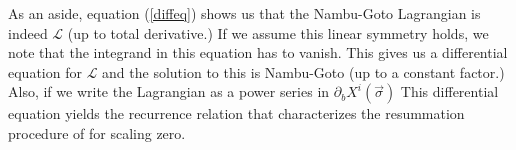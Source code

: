 \documentclass[%
 reprint,
 amsmath,amssymb,
 aps,
]{revtex4-1}
\begin{document}
As an aside, equation (\ref{diffeq}) shows us that the Nambu-Goto Lagrangian is indeed $\mathcal{L}$ (up to total derivative.) If we assume
this linear symmetry holds, we note that the integrand in this equation has to vanish. This gives us a differential
equation for $\mathcal{L}$ and the solution to this is Nambu-Goto (up to a constant factor.) Also, if we write the Lagrangian
as a power series in $\partial_b X^i (\vec{\sigma})$ This differential equation yields the recurrence relation that
characterizes the resummation procedure of \cite{Gliozzi:2012cx} for scaling zero.


\end{document}
